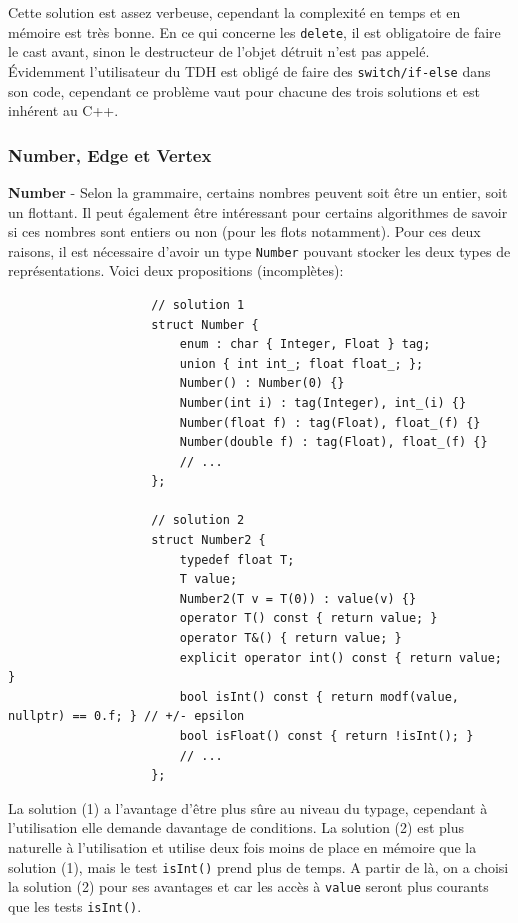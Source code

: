 \documentclass[french]{article}
\begin{document}
				Cette solution est assez verbeuse, cependant la complexité en temps et en mémoire est très bonne. En ce qui concerne les \texttt{delete}, il est obligatoire de faire le cast avant, sinon le destructeur de l'objet détruit n'est pas appelé.\\
				
				Évidemment l'utilisateur du TDH est obligé de faire des \texttt{switch/if-else} dans son code, cependant ce problème vaut pour chacune des trois solutions et est inhérent au C++.  
				
			\subsubsection{Number, Edge et Vertex}
				\label{subsubsec:number-edge-et-vertex}
				\textbf{Number} - Selon la grammaire, certains nombres peuvent soit être un entier, soit un flottant. Il peut également être intéressant pour certains algorithmes de savoir si ces nombres sont entiers ou non (pour les flots notamment). Pour ces deux raisons, il est nécessaire d'avoir un type \texttt{Number} pouvant stocker les deux types de représentations. Voici deux propositions (incomplètes):
				
				\begin{lstlisting}
					// solution 1
					struct Number {
						enum : char { Integer, Float } tag;
						union { int int_; float float_; };
						Number() : Number(0) {}
						Number(int i) : tag(Integer), int_(i) {}
						Number(float f) : tag(Float), float_(f) {}
						Number(double f) : tag(Float), float_(f) {}
						// ...
					};
					
					// solution 2
					struct Number2 {
						typedef float T;
						T value;
						Number2(T v = T(0)) : value(v) {}
						operator T() const { return value; }
						operator T&() { return value; }
						explicit operator int() const { return value; }
						bool isInt() const { return modf(value, nullptr) == 0.f; } // +/- epsilon
						bool isFloat() const { return !isInt(); }
						// ...
					};
				\end{lstlisting}
				
				La solution (1) a l'avantage d'être plus sûre au niveau du typage, cependant à l'utilisation elle demande davantage de conditions. La solution (2) est plus naturelle à l'utilisation et utilise deux fois moins de place en mémoire que la solution (1), mais le test \texttt{isInt()} prend plus de temps. A partir de là, on a choisi la solution (2) pour ses avantages et car les accès à \texttt{value} seront plus courants que les tests \texttt{isInt()}.\\
								
\end{document}
